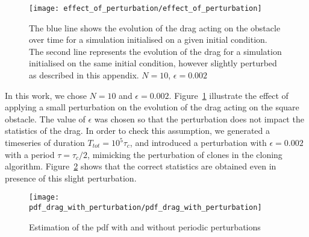 \begin{figure}
  \centering
  \texttt{[image: effect\_of\_perturbation/effect\_of\_perturbation]}
  \caption[Illustration of the perturbation of the initial condition]{The blue line shows the evolution of the drag acting on the obstacle over time for a simulation initialised on a given initial condition. The second line represents the evolution of the drag for a simulation initialised on the same initial condition, however slightly perturbed as described in this appendix. $N=10$, $\epsilon=0.002$}
  \label{fig:effect_of_perturbation}
\end{figure}

In this work, we chose $N = 10$ and $\epsilon = 0.002$.
Figure~\ref{fig:effect_of_perturbation} illustrate the effect of applying a small perturbation on the evolution of the drag acting on the square obstacle.
The value of $\epsilon$ was chosen so that the perturbation does not impact the statistics of the drag.
In order to check this assumption, we generated a timeseries of duration $T_{tot} = 10^5 \tau_c$, and introduced a perturbation with $\epsilon = 0.002$ with a period $\tau = \tau_c / 2$, mimicking the perturbation of clones in the cloning algorithm.
Figure~\ref{fig:pdf_drag_with_perturbation} shows that the correct statistics are obtained even in presence of this slight perturbation.

\begin{figure}
  \centering
  \texttt{[image: pdf\_drag\_with\_perturbation/pdf\_drag\_with\_perturbation]}
  \caption{Estimation of the \ac{pdf} with and without periodic perturbations}
  \label{fig:pdf_drag_with_perturbation}
\end{figure}
